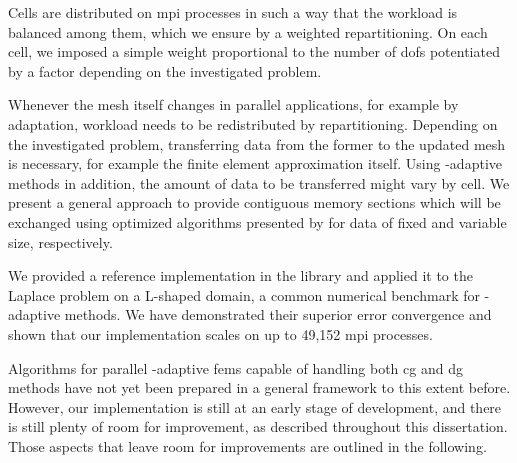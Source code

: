 Cells are distributed on \gls{mpi} processes in such a way that the workload is balanced among them, which we ensure by a weighted repartitioning. On each cell, we imposed a simple weight proportional to the number of \glspl{dof} potentiated by a factor depending on the investigated problem.

Whenever the mesh itself changes in parallel applications, for example by adaptation, workload needs to be redistributed by repartitioning. Depending on the investigated problem, transferring data from the former to the updated mesh is necessary, for example the finite element approximation itself. Using \hp-adaptive methods in addition, the amount of data to be transferred might vary by cell. We present a general approach to provide contiguous memory sections which will be exchanged using optimized algorithms presented by \textcite{burstedde2018} for data of fixed and variable size, respectively.



We provided a reference implementation in the \dealii{} library and applied it to the Laplace problem on a L-shaped domain, a common numerical benchmark for \hp-adaptive methods. We have demonstrated their superior error convergence and shown that our implementation scales on up to 49,152 \gls{mpi} processes.




Algorithms for parallel \hp-adaptive \glspl{fem} capable of handling both \gls{cg} and \gls{dg} methods have not yet been prepared in a general framework to this extent before. However, our implementation is still at an early stage of development, and there is still plenty of room for improvement, as described throughout this dissertation. Those aspects that leave room for improvements are outlined in the following.


